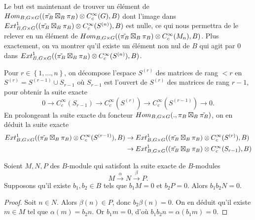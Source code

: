 Le but est maintenant de trouver un élément de $\operatorname{\mathnormal{Hom}}_{B, G \times G}((\tilde{\pi_B} \boxtimes_B \pi_B) \otimes C^\infty_c(G), B)$ dont l'image dans $\operatorname{\mathnormal{Ext}}^1_{B, G \times G}((\tilde{\pi_B} \boxtimes_B \pi_B) \otimes C^\infty_c(S^{(n)}), B)$ est nulle, ce qui nous permettra de le relever en un élément de $\operatorname{\mathnormal{Hom}}_{B, G \times G}((\tilde{\pi_B} \boxtimes_B \pi_B) \otimes C^\infty_c(M_n), B)$. Plus exactement, on va montrer qu'il existe un élément non nul de $B$ qui agit par $0$ dans $\operatorname{\mathnormal{Ext}}^1_{B, G \times G}((\tilde{\pi_B} \boxtimes_B \pi_B) \otimes C^\infty_c(S^{(n)}), B)$.

Pour $r \in \left\lbrace 1, ..., n \right\rbrace$, on décompose l'espace $S^{(r)}$ des matrices de rang $< r$ en $S^{(r)}=S^{(r-1)} \cup S_{r-1}$ où $S_{r-1}$ est l'ouvert de $S^{(r)}$ des matrices de rang $r-1$, pour obtenir la suite exacte
\begin{equation}
0 \rightarrow C^\infty_c(S_{r-1}) \rightarrow C^\infty_c(S^{(r)}) \rightarrow C^\infty_c(S^{(r-1)}) \rightarrow 0.
\end{equation}
En prolongeant la suite exacte du foncteur $\operatorname{\mathnormal{Hom}}_{B, G \times G} (., \pi_B \boxtimes_B \tilde{\pi_B})$, on en déduit la suite exacte
\begin{equation}
\begin{split}
\operatorname{\mathnormal{Ext}}^1_{B, G \times G}((\tilde{\pi_B} \boxtimes_B \pi_B) \otimes C^\infty_c(S^{(r-1)}), B) &\rightarrow \operatorname{\mathnormal{Ext}}^1_{B, G \times G}((\tilde{\pi_B} \boxtimes_B \pi_B) \otimes C^\infty_c(S^{(r)}), B) \\ 
&\rightarrow \operatorname{\mathnormal{Ext}}^1_{B, G \times G}((\tilde{\pi_B} \boxtimes_B \pi_B) \otimes C^\infty_c(S_{r-1}), B)
\end{split}
\end{equation}

\begin{lemme}
Soient $M,N,P$ des $B$-module qui satisfont la suite exacte de $B$-modules
\begin{equation}
M \xrightarrow{\alpha} N \xrightarrow{\beta} P.
\end{equation}
Supposons qu'il existe $b_1, b_2 \in B$ tels que $b_1M = 0$ et $b_2P=0$. Alors $b_1b_2N=0$.
\end{lemme}

\begin{proof}
Soit $n \in N$. Alors $\beta(n) \in P$, donc $b_2\beta(n)=0$. On en déduit qu'il existe $m \in M$ tel que $\alpha(m)=b_2n$. Or $b_1m=0$, d'où $b_1b_2n=\alpha(b_1m)=0$.
\end{proof}

